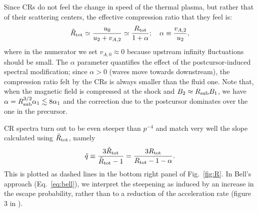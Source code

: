 \documentclass[varenna]{cimento}
\newcommand{\rt}{R_{\rm tot}}
\newcommand{\trt}{\Tilde{R}_{\rm tot}}
\newcommand{\trs}{\Tilde{R}_{\rm sub}}
\newcommand{\rs}{R_{\rm sub}}
\newcommand{\w}[1]{v_{A,#1}}
\begin{document}
Since CRs do not feel the change in speed of the thermal plasma, but rather that of their scattering centers, the effective compression ratio that they feel is:
\begin{equation}\label{eq:trt}
    \trt\simeq \frac{u_0}{u_2+\w2}\simeq \frac{\rt}{1 +\alpha}; \quad 
    \alpha\equiv \frac{\w2}{u_2},
\end{equation}
where in the numerator we set $\w0\approx 0$ because upstream infinity fluctuations should be small.
The $\alpha$ parameter quantifies the effect of the postcursor-induced spectral modification; 
since $\alpha>0$ (waves move towards downstream), the compression ratio felt by the CRs is always smaller than the fluid one.
Note that, when the magnetic field is compressed at the shock and $B_2\approx\rs B_1$, we have $\alpha= \rs^{3/2}  \alpha_1\lesssim 8\alpha_1$ and the correction due to the postcursor dominates over the one in the precursor.

CR spectra turn out to be even steeper than $p^{-4}$ and match very well the slope calculated using $\trt$, namely
\begin{equation}\label{eq:qtilde}
    \Tilde{q}\equiv \frac{3\trt}{\trt-1}=
    \frac{3\rt}{\rt-1-\alpha}.
\end{equation}
This is plotted as dashed lines in the bottom right panel of Fig.~\ref{fig:R}.
In Bell's approach (Eq.~\ref{eq:bell}), we interpret the steepening as induced by an increase in the escape probability, rather than to a reduction of the acceleration rate (figure 3 in \cite{caprioli+20}).
\end{document}
